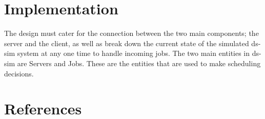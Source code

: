 \documentclass[a4paper]{article}
\begin{document}
\section{Implementation}
\label{sec:section4}
The design must cater for the connection between the two main components; the server and the client, as well as break down the current state of the simulated ds-sim system at any one time to handle incoming jobs. The two main entities in ds-sim are Servers and Jobs. These are the entities that are used to make scheduling decisions.

\section{References}
\end{document}

